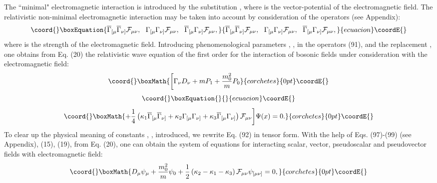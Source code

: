 \documentclass[a4paper,12pt]{article}
\begin{document}
The ``minimal" electromagnetic interaction is introduced by the
substitution \coordHE{}, where \coordHE{} is the vector-potential of the electromagnetic
field. The relativistic non-minimal electromagnetic interaction
may be taken into account by consideration of the operators (see
Appendix):
\begin{equation}\coord{}\boxEquation{
\overline{\Gamma}_{[\mu}\overline{\Gamma}_{\nu]}{\cal F}_{\mu\nu}
,~~ \Gamma_{[\mu}\Gamma_{\nu]}{\cal F}_{\mu\nu}
,~~\overline{\Gamma}_{[\mu}\Gamma_{\nu]}{\cal F}_{\mu\nu} ,
\label{91}
}{
\overline{\Gamma}_{[\mu}\overline{\Gamma}_{\nu]}{\cal F}_{\mu\nu}
,~~ \Gamma_{[\mu}\Gamma_{\nu]}{\cal F}_{\mu\nu}
,~~\overline{\Gamma}_{[\mu}\Gamma_{\nu]}{\cal F}_{\mu\nu} ,
}{ecuacion}\coordE{}\end{equation}
where \coordHE{}
is the strength of the electromagnetic field. Introducing
phenomenological parameters \coordHE{}, \coordHE{}, \coordHE{} in
the operators (91), and the replacement \coordHE{}, one obtains from Eq. (20) the relativistic wave equation
of the first order for the interaction of bosonic fields under
consideration with the electromagnetic field:
\[\coord{}\boxMath{
\biggl [ \Gamma _\nu D _\nu +mP_1+\frac{m_0^2}{m}P_0
}{corchetes}{0pt}\coordE{}\]
\vspace{-8mm}
\begin{equation}\coord{}\boxEquation{
\label{92}
}{
}{ecuacion}\coordE{}\end{equation}
\vspace{-8mm}
\[\coord{}\boxMath{
+\frac{1}{4}\left(\kappa_1\overline{\Gamma}_{[\mu}
\overline{\Gamma}_{\nu]} +\kappa_2\Gamma_{[\mu}\Gamma_{\nu]}
+\kappa_3\overline{\Gamma}_{[\mu}\Gamma_{\nu]} \right){\cal
F}_{\mu\nu}\biggr] \Psi (x)=0 .}{corchetes}{0pt}\coordE{} \label{20}
\]
To clear up the physical meaning of constants \coordHE{},
\coordHE{}, \coordHE{} introduced, we rewrite Eq. (92) in tensor
form. With the help of Eqs. (97)-(99) (see Appendix), (15), (19),
from Eq. (20), one can obtain the system of equations for
interacting scalar, vector, pseudoscalar and pseudovector fields
with electromagnetic field:
\[\coord{}\boxMath{
D_\mu \psi_\mu +\frac{m_0^2}{m}\psi_0 +\frac{1}{2}\left(\kappa_2
-\kappa_1 -\kappa_3\right){\cal F}_{\mu\nu}\psi_{[\mu\nu]}=0 ,
}{corchetes}{0pt}\coordE{}\]
\end{document}
